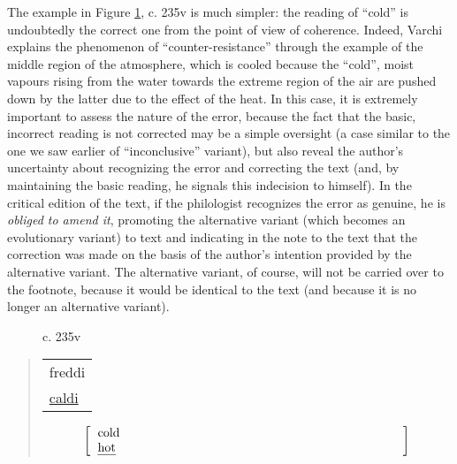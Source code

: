 \begin{paper}
\noindent The example in Figure \ref{fig:italia9d}, c. 235v is much simpler: the
reading of ``cold'' is undoubtedly the correct one from the point of view
of coherence. Indeed, Varchi explains the phenomenon of
``counter-resistance'' through the example of the middle region of the
atmosphere, which is cooled because the ``cold'', moist vapours rising
from the water towards the extreme region of the air are pushed down by
the latter due to the effect of the heat. 
In this case, it is extremely important to assess the nature of the
error, because the fact that the basic, incorrect reading is not
corrected may be a simple oversight (a case similar to the one we saw
earlier of ``inconclusive'' variant), but also reveal the author's
uncertainty about recognizing the error and correcting the text (and, by
maintaining the basic reading, he signals this indecision to himself).
In the critical edition of the text, if the philologist recognizes the
error as genuine, he is \emph{obliged to amend it}, promoting
the alternative variant (which becomes an evolutionary variant) to text
and indicating in the note to the text that the correction was made on
the basis of the author's intention provided by the alternative variant.
The alternative variant, of course, will not be carried over to the
footnote, because it would be identical to the text (and because it is
no longer an alternative variant).

\begin{minipage}[H]{\textwidth}
\begin{figure}[H]
    \centering
    \caption{c. 235v}
    \label{fig:italia9d}
\end{figure}

\begin{quote}
\begin{center}

\begin{tabular}{p{}}
	freddi \\ 
	\uline{caldi} \\
\end{tabular}    
\end{center}

\begin{center}
\begin{equation*}
	\left[\begin{tabular}{p{.70\textwidth}}
   		\text{cold} \\
    	\text{\uline{hot}} \\
	\end{tabular}\right]
\end{equation*}


\end{center}
\end{quote}
\end{minipage}
\end{paper}
